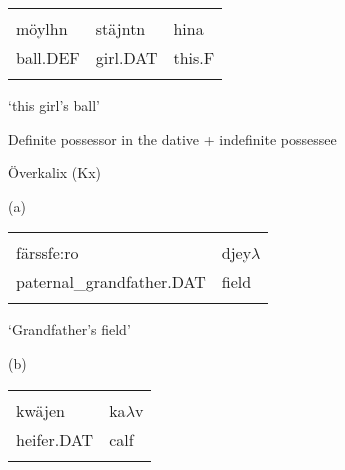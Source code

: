 \begin{tabular}{lll}
\lsptoprule
\multicolumn{3}{l}{{\bfseries\scshape possessee}

}\\
möylhn & stäjntn & hina\\
ball.DEF & girl.DAT & this.F\\
\lspbottomrule
\end{tabular}

\begin{styleTranslation}
‘this girl’s ball’

\end{styleTranslation}


\begin{listWWNumxiileveli}
\item 

\begin{styleListii}
Definite possessor in the dative + indefinite possessee

\end{styleListii}

\end{listWWNumxiileveli}

\begin{listWWNumileveli}
\item 

\begin{styleExample}
Överkalix (Kx)

\end{styleExample}

\end{listWWNumileveli}

(a)

\begin{tabular}{ll}
\lsptoprule
\multicolumn{2}{l}{{\bfseries\scshape possessor}

}\\
färssfe:ro & djey$\lambda $\\
paternal\_grandfather.DAT & field\\
\lspbottomrule
\end{tabular}

\begin{styleTranslation}
‘Grandfather’s field’

\end{styleTranslation}

(b)

\begin{tabular}{ll}
\lsptoprule
\multicolumn{2}{l}{{\bfseries\scshape possessor}

}\\
kwäjen & ka$\lambda $v\\
heifer.DAT & calf\\
\lspbottomrule
\end{tabular}

